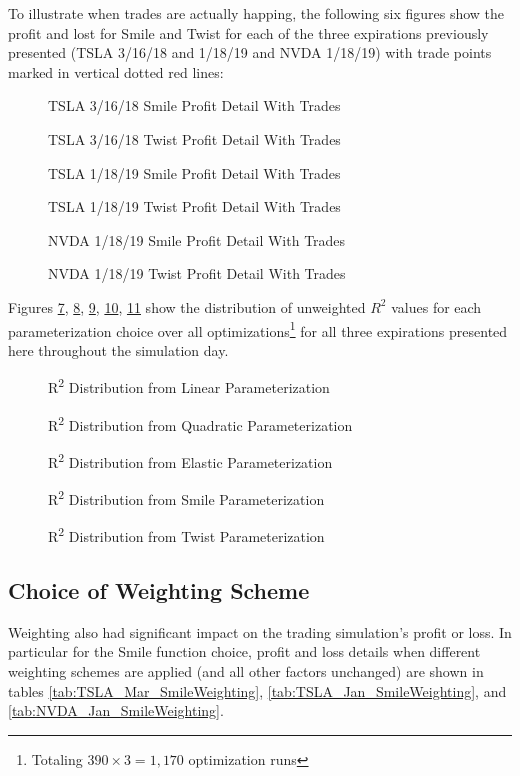 \documentclass[12pt, a4paper, notitlepage]{article}
\numberwithin{equation}{subsection}
\numberwithin{figure}{subsection}
\numberwithin{table}{subsection}
\newcommand{\img}[3]
{
    \begin{figure}[H]
	\caption{#1}
	\centerline{\fbox{\texttt{[image: \#2]}}}
	\label{#3}
    \end{figure}
}
\begin{document}
To illustrate when trades are actually happing, the following six figures show the profit and lost for Smile and Twist for each of the three expirations previously presented (TSLA 3/16/18 and 1/18/19 and NVDA 1/18/19) with trade points marked in vertical dotted red lines:

\img{TSLA 3/16/18 Smile Profit Detail With Trades}{TSLA_Mar_SmileWithTrades}{fig:TSLA_Mar_SmileWithTrades}

\img{TSLA 3/16/18 Twist Profit Detail With Trades}{TSLA_Mar_TwistWithTrades}{fig:TSLA_Mar_TwistWithTrades}

\img{TSLA 1/18/19 Smile Profit Detail With Trades}{TSLA_Jan_SmileWithTrades}{fig:TSLA_Jan_SmileWithTrades}

\img{TSLA 1/18/19 Twist Profit Detail With Trades}{TSLA_Jan_TwistWithTrades}{fig:TSLA_Jan_TwistWithTrades}

\img{NVDA 1/18/19 Smile Profit Detail With Trades}{NVDA_Jan_SmileWithTrades}{fig:NVDA_Jan_SmileWithTrades}

\img{NVDA 1/18/19 Twist Profit Detail With Trades}{NVDA_Jan_TwistWithTrades}{fig:NVDA_Jan_TwistWithTrades}


Figures \ref{fig:LinearR2Hist}, \ref{fig:QuadraticR2Hist}, \ref{fig:ElasticR2Hist},
\ref{fig:SmileR2Hist}, \ref{fig:TwistR2Hist} show the distribution of unweighted $R^2$ values for each parameterization choice over all optimizations\footnote{Totaling $390 \times 3 = 1,170$ optimization runs} for all three expirations presented here throughout the simulation day.

\img{R\textsuperscript{2} Distribution from Linear Parameterization}{LinearR2Hist}{fig:LinearR2Hist}

\img{R\textsuperscript{2} Distribution from Quadratic Parameterization}{QuadraticR2Hist}{fig:QuadraticR2Hist}

\img{R\textsuperscript{2} Distribution from Elastic Parameterization}{ElasticR2Hist}{fig:ElasticR2Hist}

\img{R\textsuperscript{2} Distribution from Smile Parameterization}{SmileR2Hist}{fig:SmileR2Hist}

\img{R\textsuperscript{2} Distribution from Twist Parameterization}{TwistR2Hist}{fig:TwistR2Hist}

\subsection{Choice of Weighting Scheme}
\label{subsec:ResultsChoiceOfWeight}
Weighting also had significant impact on the trading simulation's profit or loss.  In particular for the Smile function choice, profit and loss details when different weighting schemes are applied (and all other factors unchanged) are shown in tables \ref{tab:TSLA_Mar_SmileWeighting}, \ref{tab:TSLA_Jan_SmileWeighting}, and \ref{tab:NVDA_Jan_SmileWeighting}.
\end{document}
